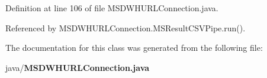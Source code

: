 Definition at line 106 of file M\+S\+D\+W\+H\+U\+R\+L\+Connection.\+java.



Referenced by M\+S\+D\+W\+H\+U\+R\+L\+Connection.\+M\+S\+Result\+C\+S\+V\+Pipe.\+run().



The documentation for this class was generated from the following file\+:\begin{DoxyCompactItemize}
\item 
java/{\bf M\+S\+D\+W\+H\+U\+R\+L\+Connection.\+java}\end{DoxyCompactItemize}
